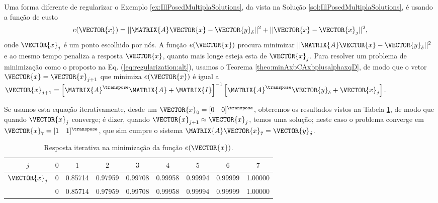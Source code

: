\begin{SolutionT}
Uma forma diferente de regularizar o Exemplo \ref{ex:IllPosedMultiplaSolutions}, 
da vista na Solução \ref{sol:IllPosedMultiplaSolutions},
é usando a função de custo 
\begin{equation}\label{eq:regularization:alt}
e(\VECTOR{x})=||\MATRIX{A}\VECTOR{x}-\VECTOR{y}_{\delta}||^2+||\VECTOR{x}-\VECTOR{x}_{j}||^2,
\end{equation}
onde $\VECTOR{x}_{j}$ é um ponto escolhido por nós.
A função $e(\VECTOR{x})$ procura minimizar $||\MATRIX{A}\VECTOR{x}-\VECTOR{y}_{\delta}||^2$
e ao mesmo tempo penaliza a resposta $\VECTOR{x}$,
quanto mais longe esteja esta de $\VECTOR{x}_{j}$.
Para resolver um problema de minimização como o proposto na Eq. (\ref{eq:regularization:alt}),
usamos o Teorema \ref{theo:minAxbCAxbplusalphaxqD}, de modo que o vetor $\VECTOR{x}=\VECTOR{x}_{j+1}$ que minimiza $e(\VECTOR{x})$
é igual a
$
\VECTOR{x}_{j+1} =
\left[ \MATRIX{A}^{\transpose}\MATRIX{A} +\MATRIX{I}\right]^{-1}\left[ \MATRIX{A}^{\transpose} \VECTOR{y}_{\delta}+ \VECTOR{x}_{j}\right].
$

Se usamos esta equação iterativamente, desde um $\VECTOR{x}_{0}=[0\quad 0]^{\transpose}$, 
obteremos os resultados vistos na Tabela \ref{tab:IllPosedMultiplaSolution},
de modo que quando $\VECTOR{x}_{j}$ converge; é dizer, quando $\VECTOR{x}_{j+1}\approx \VECTOR{x}_{j}$,
temos uma solução;  neste caso o problema converge em $\VECTOR{x}_{7}=[1\quad 1]^{\transpose}$,
que sim cumpre o sistema $\MATRIX{A}\VECTOR{x}_{7}=\VECTOR{y}_{\delta}$.
\end{SolutionT}


\begin{table}[h!]
\centering
 \begin{tabular}{|c|c|c|c|c|c|c|c|c|} 
 \hline
 $j$ & $0$ & $1$ & $2$ & $3$ & $4$ & $5$ & $6$ & $7$ \\ \hline
 \hline
 $\VECTOR{x}_{j}$ & 0 & 0.85714 & 0.97959 & 0.99708 & 0.99958 & 0.99994 & 0.99999 & 1.00000 \\
 ~                & 0 & 0.85714 & 0.97959 & 0.99708 & 0.99958 & 0.99994 & 0.99999 & 1.00000 \\
 \hline
 \end{tabular}
\caption{Resposta iterativa na minimização da função $e(\VECTOR{x})$.}
\label{tab:IllPosedMultiplaSolution}
\end{table}



